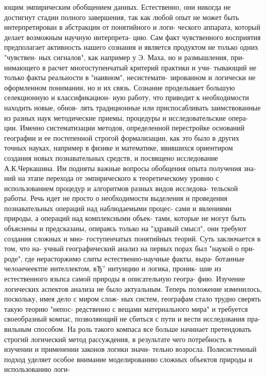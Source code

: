 \documentclass[12pt,draft,openany]{extbook}
\begin{document}
ющим эмпирическим обобщением данных. Естественно, они никогда
не достигнут стадии полного завершения, так как любой опыт не
может быть интерпретирован в абстракции от понятийного и логи-
ческого аппарата, который делает возможным научную интерпрета-
цию. Сам факт чувственного восприятия предполагает активность
нашего сознания и является продуктом не только одних "чувствен-
ных сигналов", как например у Э. Маха, но и размышления, при-
нимающего в расчет многоступенчатый критерий практики и учи-
тывающий не только факты реальности в "наивном", несистемати-
зированном и логически не оформленном понимании, но и их связь.
Сознание проделывает большую селекционную и классификацион-
ную работу, что приводит к необходимости находить новые, обнов-
лять традиционные или приспосабливать заимствованные из разных
наук методические приемы, процедуры и исследовательские опера-
ции. Именно систематизации методов, определенной перестройке
оснований географии и ее постепенной строгой формализации, как
это было в других точных науках, например в физике и математике,
явившихся ориентиром создания новых познавательных средств, и
посвящено исследование А.К.Черкашина.
Им подняты важные вопросы обобщения опыта получения зна-
ний на этапе перехода от эмпирического к теоретическому уровню
с использованием процедур и алгоритмов разных видов исследова-
тельской работы. Речь идет не просто о необходимости выделения
и проведения познавательных операций над наблюдаемыми процес-
сами и явлениями природы, а операций над комплексными объек-
тами, которые не могут быть объяснены и предсказаны, опираясь
только на "здравый смысл", они требуют создания сложных и мно-
гоступенчатых понятийных теорий. Суть заключается в том, что на-
учный географический анализ на первых порах был "наукой о при-
роде", где нерасторжимо слиты естественно-научные факты, выра-
ботанные челоаечеектпе интеллектом, вЂ” интуицию и логика, проник-
шие из естественного язьпса самой природы в описательиую геогра-
фию. Изучение логических аспектов анализа не было актуальным.
Теперь положение изменилось, поскольку, имея дело с миром слож-
ных систем, географам стало трудно сверять такую теорию "непос-
редственно с вещами материального мира" и требуется своеобразный
компас, позволяющий не сбиться с пути и вести исследования пра-
вильным способом. На роль такого компаса все больше начинает
претендовать строгий логический метод рассуждения, в результате
чего потребность в изучении и применении законов логики значи-
тельно возросла. Полисистемный подход уделяет особое внимание
моделированию сложных объектов природы и использованию логи-
\end{document}
